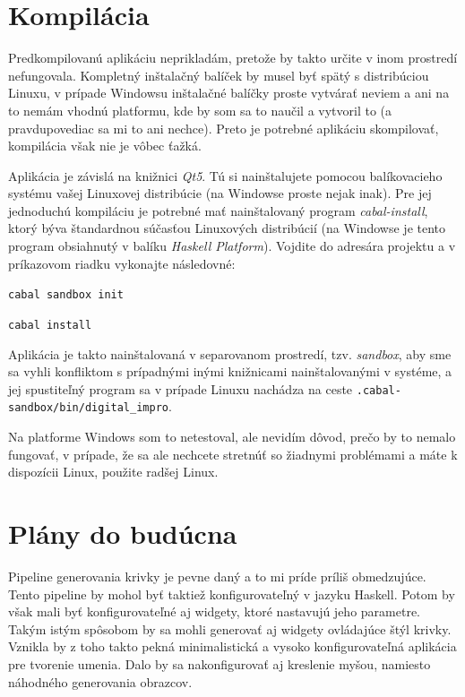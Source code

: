 \documentclass[11pt,a4paper]{article}
\begin{document}
\section{Kompilácia}

Predkompilovanú aplikáciu neprikladám, pretože by takto určite v inom prostredí
nefungovala. Kompletný inštalačný balíček by musel byť spätý s distribúciou
Linuxu, v prípade Windowsu inštalačné balíčky proste vytvárať neviem a ani na to
nemám vhodnú platformu, kde by som sa to naučil a vytvoril to (a pravdupovediac
sa mi to ani nechce). Preto je potrebné aplikáciu skompilovať, kompilácia však
nie je vôbec ťažká.

Aplikácia je závislá na knižnici \emph{Qt5}. Tú si nainštalujete pomocou
balíkovacieho systému vašej Linuxovej distribúcie (na Windowse proste nejak
inak). Pre jej jednoduchú kompiláciu je potrebné mať nainštalovaný program
\emph{cabal-install}, ktorý býva štandardnou súčasťou Linuxových distribúcií (na
Windowse je tento program obsiahnutý v balíku \emph{Haskell Platform}). Vojdite
do adresára projektu a v príkazovom riadku vykonajte následovné:

\texttt{cabal sandbox init}

\texttt{cabal install}

Aplikácia je takto nainštalovaná v separovanom prostredí, tzv. \emph{sandbox},
aby sme sa vyhli konfliktom s prípadnými inými knižnicami nainštalovanými v
systéme, a jej spustiteľný program sa v prípade Linuxu nachádza na ceste
\texttt{.cabal-sandbox/bin/digital\_impro}.

Na platforme Windows som to netestoval, ale nevidím dôvod, prečo by to nemalo
fungovať, v prípade, že sa ale nechcete stretnúť so žiadnymi problémami a máte k
dispozícii Linux, použite radšej Linux.

\section{Plány do budúcna}

Pipeline generovania krivky je pevne daný a to mi príde príliš obmedzujúce.
Tento pipeline by mohol byť taktiež konfigurovateľný v jazyku Haskell. Potom by
však mali byť konfigurovateľné aj widgety, ktoré nastavujú jeho parametre. Takým
istým spôsobom by sa mohli generovať aj widgety ovládajúce štýl krivky. Vznikla
by z toho takto pekná minimalistická a vysoko konfigurovateľná aplikácia pre
tvorenie umenia. Dalo by sa nakonfigurovať aj kreslenie myšou, namiesto
náhodného generovania obrazcov.
\end{document}
